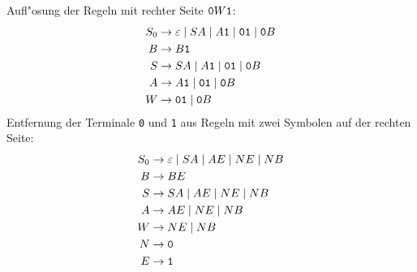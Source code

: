 \begin{loesung}
Aufl"osung der Regeln mit rechter Seite ${\tt 0}W{\tt 1}$:
\begin{align*}
S_0&\to \varepsilon\;|\;SA\;|\;A{\tt 1}\;|\;{\tt 01}\;|\;{\tt 0}B\\
B  &\to B{\tt 1}\\
S  &\to SA\;|\;A{\tt 1}\;|\;{\tt 01}\;|\;{\tt 0}B\\
A  &\to A{\tt 1}\;|\;{\tt 01}\;|\;{\tt 0}B\\
W  &\to {\tt 01}\;|\; {\tt 0}B
\end{align*}
Entfernung der Terminale {\tt 0} und {\tt 1} aus Regeln mit zwei Symbolen
auf der rechten Seite:
\begin{align*}
S_0&\to \varepsilon\;|\;SA\;|\;AE\;|\;NE\;|\;NB\\
B  &\to BE\\
S  &\to SA\;|\;AE\;|\;NE\;|\;NB\\
A  &\to AE\;|\;NE\;|\;NB\\
W  &\to NE\;|\; NB\\
N  &\to {\tt 0}\\
E  &\to {\tt 1}
\end{align*}
\end{loesung}
